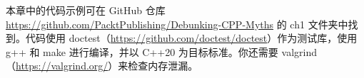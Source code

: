 本章中的代码示例可在 GitHub 仓库 \url{https://github.com/PacktPublishing/Debunking-CPP-Myths} 的 ch1 文件夹中找到。代码使用 doctest（\url{https://github.com/doctest/doctest}）作为测试库，使用 g++ 和 make 进行编译，并以 C++20 为目标标准。你还需要 valgrind（\url{https://valgrind.org/}）来检查内存泄漏。